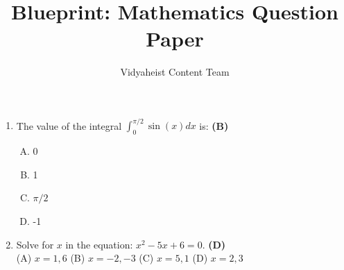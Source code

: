 \documentclass{article}
\begin{document}
\title{Blueprint: Mathematics Question Paper}
\author{Vidyaheist Content Team}
\date{}
\maketitle

\begin{enumerate}

    \item The value of the integral $\int_{0}^{\pi/2} \sin(x) dx$ is: \hfill \textbf{(B)}
    \begin{enumerate}[(A)]
        \item 0
        \item 1
        \item $\pi/2$
        \item -1
    \end{enumerate}

    \item Solve for $x$ in the equation: $x^2 - 5x + 6 = 0$. \hfill \textbf{(D)}
    \\(A) $x = 1, 6$ (B) $x = -2, -3$ (C) $x = 5, 1$ (D) $x = 2, 3$

\end{enumerate}
\end{document}
